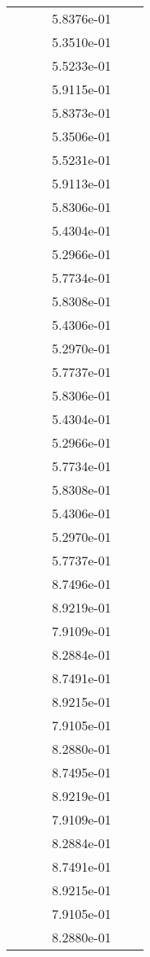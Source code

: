 \begin{xltabular}{\textwidth}{r|rS[table-format=1.3e+2]S[table-format=1.4e+2]S[table-format=1.4e+2]S[table-format=-1.5]}
&  &  & 5.8376e-01 & & \\
&  &  & 5.3510e-01 & & \\
&  &  & 5.5233e-01 & & \\
&  &  & 5.9115e-01 & & \\
&  &  & 5.8373e-01 & & \\
&  &  & 5.3506e-01 & & \\
&  &  & 5.5231e-01 & & \\
&  &  & 5.9113e-01 & & \\
&  &  & 5.8306e-01 & & \\
&  &  & 5.4304e-01 & & \\
&  &  & 5.2966e-01 & & \\
&  &  & 5.7734e-01 & & \\
&  &  & 5.8308e-01 & & \\
&  &  & 5.4306e-01 & & \\
&  &  & 5.2970e-01 & & \\
&  &  & 5.7737e-01 & & \\
&  &  & 5.8306e-01 & & \\
&  &  & 5.4304e-01 & & \\
&  &  & 5.2966e-01 & & \\
&  &  & 5.7734e-01 & & \\
&  &  & 5.8308e-01 & & \\
&  &  & 5.4306e-01 & & \\
&  &  & 5.2970e-01 & & \\
&  &  & 5.7737e-01 & & \\
&  &  & 8.7496e-01 & & \\
&  &  & 8.9219e-01 & & \\
&  &  & 7.9109e-01 & & \\
&  &  & 8.2884e-01 & & \\
&  &  & 8.7491e-01 & & \\
&  &  & 8.9215e-01 & & \\
&  &  & 7.9105e-01 & & \\
&  &  & 8.2880e-01 & & \\
&  &  & 8.7495e-01 & & \\
&  &  & 8.9219e-01 & & \\
&  &  & 7.9109e-01 & & \\
&  &  & 8.2884e-01 & & \\
&  &  & 8.7491e-01 & & \\
&  &  & 8.9215e-01 & & \\
&  &  & 7.9105e-01 & & \\
&  &  & 8.2880e-01 & & \\

\end{xltabular}
